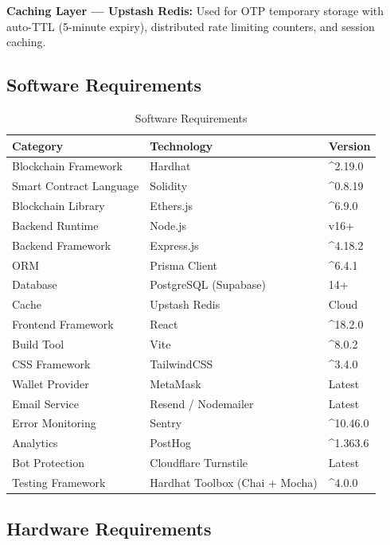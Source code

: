 \documentclass[oneside,a4paper,12pt]{book}
\begin{document}
\textbf{Caching Layer --- Upstash Redis:} Used for OTP temporary storage with auto-TTL (5-minute expiry), distributed rate limiting counters, and session caching.

\subsection{Software Requirements}

\begin{table}[htbp]
\centering
\renewcommand{\arraystretch}{1.2}
\small
\begin{tabularx}{\textwidth}{|p{4cm}|p{4.5cm}|X|}
\hline
\textbf{Category} & \textbf{Technology} & \textbf{Version} \\
\hline
Blockchain Framework & Hardhat & \^{}2.19.0 \\
\hline
Smart Contract Language & Solidity & \^{}0.8.19 \\
\hline
Blockchain Library & Ethers.js & \^{}6.9.0 \\
\hline
Backend Runtime & Node.js & v16+ \\
\hline
Backend Framework & Express.js & \^{}4.18.2 \\
\hline
ORM & Prisma Client & \^{}6.4.1 \\
\hline
Database & PostgreSQL (Supabase) & 14+ \\
\hline
Cache & Upstash Redis & Cloud \\
\hline
Frontend Framework & React & \^{}18.2.0 \\
\hline
Build Tool & Vite & \^{}8.0.2 \\
\hline
CSS Framework & TailwindCSS & \^{}3.4.0 \\
\hline
Wallet Provider & MetaMask & Latest \\
\hline
Email Service & Resend / Nodemailer & Latest \\
\hline
Error Monitoring & Sentry & \^{}10.46.0 \\
\hline
Analytics & PostHog & \^{}1.363.6 \\
\hline
Bot Protection & Cloudflare Turnstile & Latest \\
\hline
Testing Framework & Hardhat Toolbox (Chai + Mocha) & \^{}4.0.0 \\
\hline
\end{tabularx}
\caption{Software Requirements}
\label{tab:sw_req}
\end{table}

\subsection{Hardware Requirements}
\end{document}
